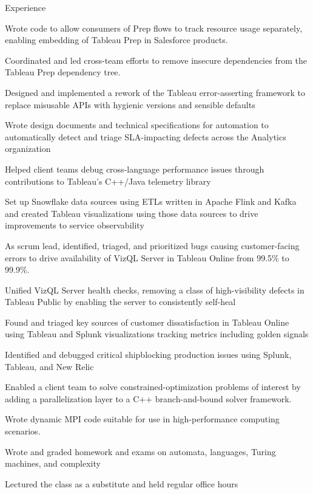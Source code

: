 \documentclass{cv}
\begin{document}

\begin{cvsection}{Experience}
  {
    \item Wrote code to allow consumers of Prep flows to track resource usage separately, enabling embedding of Tableau Prep in Salesforce products.
    \item Coordinated and led cross-team efforts to remove insecure dependencies from the Tableau Prep dependency tree.
    \item Designed and implemented a rework of the Tableau error-asserting framework to replace misusable APIs with hygienic versions and sensible defaults
    \item Wrote design documents and technical specifications for automation to automatically detect and triage SLA-impacting defects across the Analytics organization
    \item Helped client teams debug cross-language performance issues through contributions to Tableau's C++/Java telemetry library
    \item Set up Snowflake data sources using ETLs written in Apache Flink and Kafka and created Tableau visualizations using those data sources to drive improvements to service observability
    \item As scrum lead, identified, triaged, and prioritized bugs causing customer-facing errors to drive availability of VizQL Server in Tableau Online from 99.5\% to 99.9\%.
    \item Unified VizQL Server health checks, removing a class of high-visibility defects in Tableau Public by enabling the server to consistently self-heal
    \item Found and triaged key sources of customer dissatisfaction in Tableau Online using Tableau and Splunk visualizations tracking metrics including golden signals
    \item Identified and debugged critical shipblocking production issues using Splunk, Tableau, and New Relic
  }
  {
    \item Enabled a client team to solve constrained-optimization problems of interest by adding a parallelization layer to a C++ branch-and-bound solver framework.
    \item Wrote dynamic MPI code suitable for use in high-performance computing scenarios.
  }
  {
    \item Wrote and graded homework and exams on automata, languages, Turing machines, and complexity
    \item Lectured the class as a substitute and held regular office hours
  }
\end{cvsection}
\end{document}
